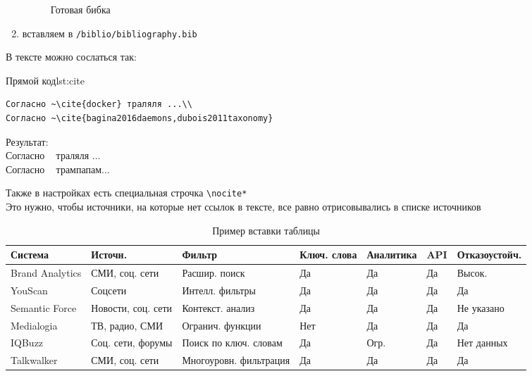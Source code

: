 \begin{enumerate}
\begin{figure}[H]
        \caption{Готовая бибка}
        \label{fig:bibtex}
    \end{figure}
    \item вставляем в \texttt{/biblio/bibliography.bib}
\end{enumerate}

В тексте можно сослаться так:
\begin{codeblockenv}{Прямой код}{lst:cite}
\begin{lstlisting}[language=Tex,frame=single]
Согласно ~\cite{docker} траляля ...\\
Согласно ~\cite{bagina2016daemons,dubois2011taxonomy}
\end{lstlisting}
\end{codeblockenv}
Результат:\\
Согласно ~\cite{docker} траляля ...\\
Согласно ~\cite{bagina2016daemons,dubois2011taxonomy} трампапам...

Также в настройках есть специальная строчка \texttt{\textbackslash nocite{*}}\\
Это нужно, чтобы источники, на которые нет ссылок в тексте, все равно отрисовывались в списке источников

\newpage
{}
\begin{table}[H]
    \caption{Пример вставки таблицы}\label{tab:table}
    \centering
    \begin{tabular}{|p{2.3cm}|p{2.0cm}|p{3cm}|p{1.5cm}|p{1.5cm}|p{1.5cm}|p{1.6cm}|} %
        \hline
        \textbf{Система} & \textbf{Источн.}     & \textbf{Фильтр}        & \textbf{Ключ. слова} & \textbf{Анали\-тика} & \textbf{API} & \textbf{Отказо\-устойч.} \\ \hline
        Brand Analytics  & СМИ, соц. сети       & Расшир. поиск          & Да                   & Да                   & Да           & Высок.                   \\ \hline
        YouScan          & Соцсети              & Интелл. фильтры        & Да                   & Да                   & Да           & Да                       \\ \hline
        Semantic Force   & Новости, соц. сети   & Контекст. анализ       & Да                   & Да                   & Да           & Не указано               \\ \hline
        Medialogia       & ТВ, радио, СМИ       & Огранич. функции       & Нет                  & Да                   & Да           & Да                       \\ \hline
        IQBuzz           & Соц. сети, форумы    & Поиск по ключ. словам  & Да                   & Огр.                 & Да           & Нет данных               \\ \hline
        Talkwalker       & СМИ, соц. сети       & Многоуровн. фильтрация & Да                   & Да                   & Да           & Да                       \\ \hline
    \end{tabular}
\end{table}

